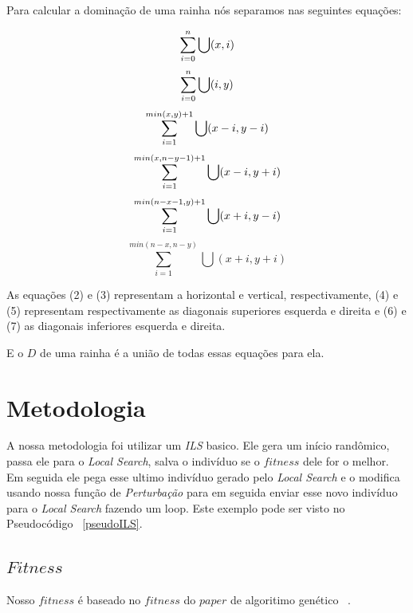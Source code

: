 \documentclass[
	article,			%
	11pt,				%
	oneside,			%
	a4paper,			%
	english,			%
	brazil,				%
	sumario=tradicional
	]{abntex2}
\begin{document}
Para calcular a dominação de uma rainha nós separamos nas seguintes equações:

\begin{equation}
  \sum_{i=0}^{n} \bigcup (x, i) \\
\end{equation}
\begin{equation}
  \sum_{i=0}^{n} \bigcup (i, y) \\
\end{equation}
\begin{equation}
  \sum_{i=1}^{min(x,y)+1} \bigcup (x-i, y-i) \\
\end{equation}
\begin{equation}
  \sum_{i=1}^{min(x,n-y-1)+1} \bigcup (x-i, y+i) \\
\end{equation}
\begin{equation}
  \sum_{i=1}^{min(n-x-1,y)+1} \bigcup (x+i, y-i) \\
\end{equation}
\begin{equation}
  \sum_{i=1}^{min(n-x,n-y)} \bigcup (x+i, y+i)
\end{equation}

As equações (2) e (3) representam a horizontal e vertical, respectivamente, (4) e (5) representam respectivamente as diagonais superiores esquerda e direita e (6) e (7) as diagonais inferiores esquerda e direita.

E o $D$ de uma rainha é a união de todas essas equações para ela.
\section{Metodologia}

A nossa metodologia foi utilizar um \textit{ILS} basico. Ele gera um início randômico, passa ele para o \textit{Local Search}, salva o indivíduo se o $fitness$ dele for o melhor. Em seguida ele pega esse ultimo indivíduo gerado pelo \textit{Local Search} e o modifica usando nossa função de \textit{Perturbação} para em seguida enviar esse novo indivíduo para o \textit{Local Search} fazendo um loop. Este exemplo pode ser visto no Pseudocódigo ~\ref{pseudoILS}.

\subsection{$Fitness$}

Nosso $fitness$ é baseado no $fitness$ do $paper$ de algoritimo genético ~\cite{alharbi2017genetic}.
\end{document}
